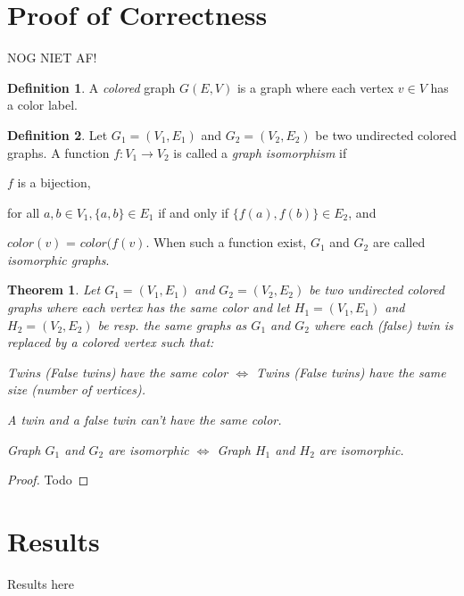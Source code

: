 \documentclass[twoside]{article}
\theoremstyle{definition}
\newtheorem{definition}{Definition}
\theoremstyle{plain}
\newtheorem{theorem}{Theorem}
\begin{document}
\begin{multicols}{2}
\section{Proof of Correctness}
NOG NIET AF!
\begin{definition}
A \emph{colored} graph $G(E,V)$ is a graph where each vertex $v \in V$ has a color label.
\end{definition}
\begin{definition}
Let $G_1 = (V_1, E_1)$ and $G_2 = (V_2, E_2)$ be two undirected colored graphs. A function $f: V_1 \to V_2$ is called a \emph{graph isomorphism} if \begin{compactenum}[\upshape(a)]
\item $f$ is a bijection, 
\item for all $a, b \in V_1, \{a, b\} \in E_1$ if and only if $\{f(a), f(b)\} \in E_2$, and 
\item $color(v)$ = $color (f(v)$. When such a function exist, $G_1$ and $G_2$ are called \emph{isomorphic graphs}. 
\end{compactenum}
\end{definition}
\begin{theorem}
Let $G_1 = (V_1, E_1)$ and $G_2 = (V_2, E_2)$ be two undirected colored graphs where each vertex has the same color and let $H_1 = (V_1, E_1)$ and $H_2 = (V_2, E_2)$ be resp. the same graphs as $G_1$ and $G_2$ where each (false) twin is replaced by a colored vertex such that: \begin{compactenum}[\upshape(a)]
\item Twins (False twins) have the same color $\iff$ Twins (False twins) have the same size (number of vertices).
\item A twin and a false twin can't have the same color.
\end{compactenum}
Graph $G_1$ and $G_2$ are isomorphic $\iff$ Graph $H_1$ and $H_2$ are isomorphic.
\end{theorem}
\begin{proof}
Todo
\end{proof}


\section{Results}

Results here


\end{multicols}
\end{document}
